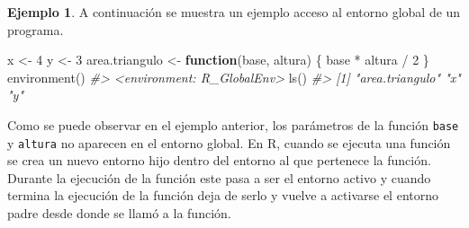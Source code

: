 \documentclass[
]{book}
\newenvironment{Shaded}{\begin{snugshade}}{\end{snugshade}}
\newcommand{\CommentTok}[1]{\textcolor[rgb]{0.56,0.35,0.01}{\textit{#1}}}
\newcommand{\ControlFlowTok}[1]{\textcolor[rgb]{0.13,0.29,0.53}{\textbf{#1}}}
\newcommand{\DecValTok}[1]{\textcolor[rgb]{0.00,0.00,0.81}{#1}}
\newcommand{\FunctionTok}[1]{\textcolor[rgb]{0.00,0.00,0.00}{#1}}
\newcommand{\NormalTok}[1]{#1}
\newcommand{\OtherTok}[1]{\textcolor[rgb]{0.56,0.35,0.01}{#1}}
\newcommand{\SpecialCharTok}[1]{\textcolor[rgb]{0.00,0.00,0.00}{#1}}
\theoremstyle{definition}
\theoremstyle{definition}
\newtheorem{example}{Ejemplo}[chapter]
\theoremstyle{definition}
\theoremstyle{definition}
\theoremstyle{remark}
\begin{document}
\begin{example}

A continuación se muestra un ejemplo acceso al entorno global de un programa.

\begin{Shaded}
\begin{Highlighting}[]
\NormalTok{x }\OtherTok{\textless{}{-}} \DecValTok{4}
\NormalTok{y }\OtherTok{\textless{}{-}} \DecValTok{3}
\NormalTok{area.triangulo }\OtherTok{\textless{}{-}} \ControlFlowTok{function}\NormalTok{(base, altura) \{}
\NormalTok{  base }\SpecialCharTok{*}\NormalTok{ altura }\SpecialCharTok{/} \DecValTok{2}
\NormalTok{\}}
\FunctionTok{environment}\NormalTok{()}
\CommentTok{\#\textgreater{} \textless{}environment: R\_GlobalEnv\textgreater{}}
\FunctionTok{ls}\NormalTok{()}
\CommentTok{\#\textgreater{} [1] "area.triangulo" "x"              "y"}
\end{Highlighting}
\end{Shaded}

\end{example}

Como se puede observar en el ejemplo anterior, los parámetros de la función \texttt{base} y \texttt{altura} no aparecen en el entorno global. En R, cuando se ejecuta una función se crea un nuevo entorno hijo dentro del entorno al que pertenece la función. Durante la ejecución de la función este pasa a ser el entorno activo y cuando termina la ejecución de la función deja de serlo y vuelve a activarse el entorno padre desde donde se llamó a la función.
\end{document}

